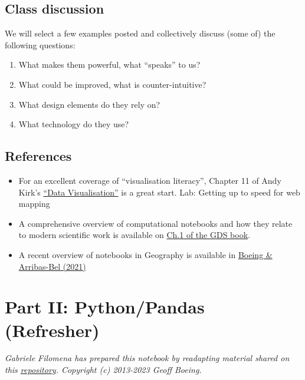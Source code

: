 \documentclass[
  letterpaper,
  DIV=11,
  numbers=noendperiod]{scrreprt}
\providecommand{\tightlist}{%
  \setlength{\itemsep}{0pt}\setlength{\parskip}{0pt}}\usepackage{longtable,booktabs,array}
\begin{document}
\subsection{Class discussion}\label{class-discussion}

We will select a few examples posted and collectively discuss (some of)
the following questions:

\begin{enumerate}
\def\labelenumi{\arabic{enumi}.}
\tightlist
\item
  What makes them powerful, what ``speaks'' to us?
\item
  What could be improved, what is counter-intuitive?
\item
  What design elements do they rely on?
\item
  What technology do they use?
\end{enumerate}

\subsection{References}\label{references}

\begin{itemize}
\tightlist
\item
  For an excellent coverage of ``visualisation literacy'', Chapter 11 of
  Andy Kirk's \href{https://www.visualisingdata.com/book/}{``Data
  Visualisation''} is a great start. Lab: Getting up to speed for web
  mapping
\item
  A comprehensive overview of computational notebooks and how they
  relate to modern scientific work is available on
  \href{https://geographicdata.science/book/notebooks/01_geo_thinking.html}{Ch.1
  of the GDS book}.
\item
  A recent overview of notebooks in Geography is available in
  \href{https://gistbok.ucgis.org/bok-topics/gis-and-computational-notebooks}{Boeing
  \& Arribas-Bel (2021)}
\end{itemize}

\section{Part II: Python/Pandas
(Refresher)}\label{part-ii-pythonpandas-refresher}

\emph{Gabriele Filomena has prepared this notebook by readapting
material shared on this
\href{https://github.com/gboeing/ppd599/tree/main}{repository}.
Copyright (c) 2013-2023 Geoff Boeing.}
\end{document}
